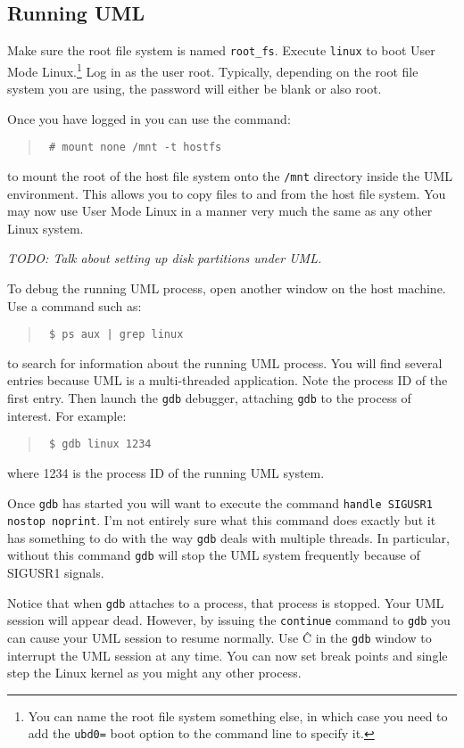 \documentclass{article}
\newcommand{\command}[1]{\texttt{#1}}
\newcommand{\filename}[1]{\texttt{#1}}
\newcommand{\todo}[1]{\textit{TODO: #1}}
\newenvironment{commands}
  {\begin{quote} \tt}
  {\end{quote}}
\begin{document}
\subsection{Running UML}

Make sure the root file system is named \filename{root\_fs}. Execute \command{linux} to boot
User Mode Linux.\footnote{You can name the root file system something else, in which case you
  need to add the \texttt{ubd0=} boot option to the command line to specify it.} Log in as the
user root. Typically, depending on the root file system you are using, the password will either
be blank or also root.

Once you have logged in you can use the command:
\begin{commands}
  \# mount none /mnt -t hostfs
\end{commands}
to mount the root of the host file system onto the \filename{/mnt} directory inside the UML
environment. This allows you to copy files to and from the host file system. You may now use
User Mode Linux in a manner very much the same as any other Linux system.

\todo{Talk about setting up disk partitions under UML.}

To debug the running UML process, open another window on the host machine. Use a command such
as:
\begin{commands}
  \$ ps aux | grep linux
\end{commands}
to search for information about the running UML process. You will find several entries because
UML is a multi-threaded application. Note the process ID of the first entry. Then launch the
\command{gdb} debugger, attaching \command{gdb} to the process of interest. For example:
\begin{commands}
  \$ gdb linux 1234
\end{commands}
where 1234 is the process ID of the running UML system.

Once \command{gdb} has started you will want to execute the command \command{handle SIGUSR1
  nostop noprint}. I'm not entirely sure what this command does exactly but it has something to
do with the way \command{gdb} deals with multiple threads. In particular, without this command
\command{gdb} will stop the UML system frequently because of SIGUSR1 signals.

Notice that when \command{gdb} attaches to a process, that process is stopped. Your UML session
will appear dead. However, by issuing the \command{continue} command to \command{gdb} you can
cause your UML session to resume normally. Use \^C in the \command{gdb} window to interrupt the
UML session at any time. You can now set break points and single step the Linux kernel as you
might any other process.
\end{document}
